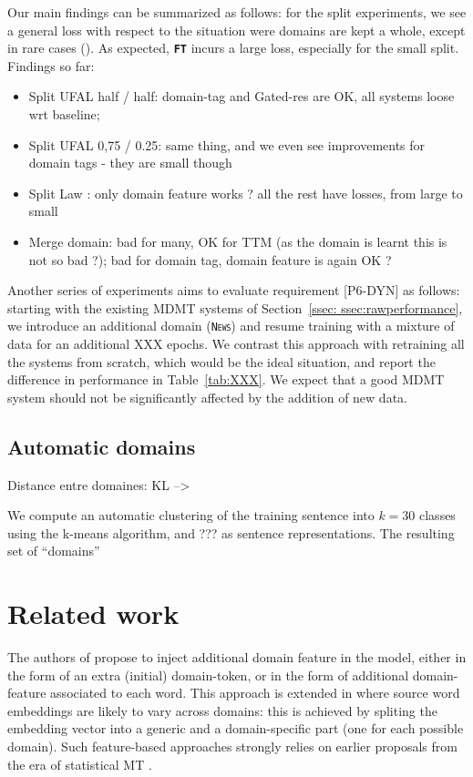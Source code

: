 \documentclass[11pt]{article}
\newcommand{\fyTodo}[1]{\Todo[FY:]{\textcolor{orange}{#1}}}
\newcommand{\domain}[1]{\texttt{\textsc{#1}}}
\newcommand{\system}[1]{\texttt{\textbf{#1}}}
\begin{document}
Our main findings can be summarized as follows: for the split experiments, we see a general loss with respect to the situation were domains are kept a whole, except in rare cases (). As expected, \system{FT} incurs a large loss, especially for the small split. 
Findings so far:
\begin{itemize}
\item Split UFAL half / half: domain-tag and Gated-res are OK, all systems loose wrt baseline; 
\item Split UFAL 0,75 / 0.25: same thing, and we even see improvements for domain tags - they are small though
\item Split Law : only domain feature works ? all the rest have losses, from large to small
\item Merge domain: bad for many, OK for TTM (as the domain is learnt this is not so bad ?); bad for domain tag, domain feature is again OK ?
\end{itemize}

\fyTodo{We need significance testing}

Another series of experiments aims to evaluate requirement [P6-DYN] as follows: starting with the existing MDMT systems of Section~\ref{ssec: ssec:rawperformance}, we introduce an additional domain (\domain{News}) and resume training with a mixture of data for an additional XXX epochs. We contrast this approach with retraining all the systems from scratch, which would be the ideal situation, and report the difference in performance in Table~\ref{tab:XXX}. We expect that a good MDMT system should not be significantly affected by the addition of new data.

\subsection{Automatic domains \label{ssec:autodomains}}
\begin{todo}
  Distance entre domaines: KL -->
\end{todo}

We compute an automatic clustering of the training sentence into $k=30$ classes using the k-means algorithm, and ??? as sentence representations. The resulting set of ``domains'' 


\section{Related work \label{sec:related}}

The authors of \cite{Kobus17domaincontrol} propose to inject additional domain feature in the model, either in the form of an extra (initial) domain-token, or in the form of additional domain-feature associated to each word. This approach is extended in \cite{Pham19generic} where source word embeddings are likely to vary across domains: this is achieved by spliting the embedding vector into a generic and a domain-specific part (one for each possible domain). Such feature-based approaches strongly relies on earlier proposals from the era of statistical MT \cite{Daume07frustratingly,Clark12onesystem}.
\end{document}
